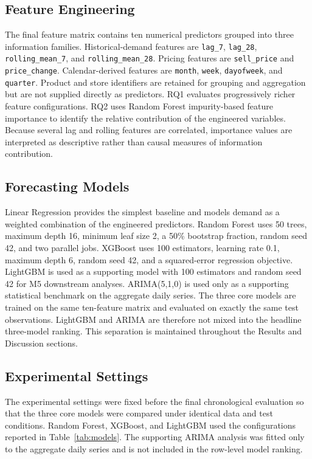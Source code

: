 \subsection{Feature Engineering}

The final feature matrix contains ten numerical predictors grouped into three information families.
Historical-demand features are \texttt{lag\_7}, \texttt{lag\_28}, \texttt{rolling\_mean\_7}, and \texttt{rolling\_mean\_28}.
Pricing features are \texttt{sell\_price} and \texttt{price\_change}.
Calendar-derived features are \texttt{month}, \texttt{week}, \texttt{dayofweek}, and \texttt{quarter}.
Product and store identifiers are retained for grouping and aggregation but are not supplied directly as predictors.
RQ1 evaluates progressively richer feature configurations.
RQ2 uses Random Forest impurity-based feature importance to identify the relative contribution of the engineered variables.
Because several lag and rolling features are correlated, importance values are interpreted as descriptive rather than causal measures of information contribution.

\subsection{Forecasting Models}

Linear Regression provides the simplest baseline and models demand as a weighted combination of the engineered predictors.
Random Forest uses 50 trees, maximum depth 16, minimum leaf size 2, a 50\% bootstrap fraction, random seed 42, and two parallel jobs.
XGBoost uses 100 estimators, learning rate 0.1, maximum depth 6, random seed 42, and a squared-error regression objective.
LightGBM is used as a supporting model with 100 estimators and random seed 42 for M5 downstream analyses.
ARIMA(5,1,0) is used only as a supporting statistical benchmark on the aggregate daily series.
The three core models are trained on the same ten-feature matrix and evaluated on exactly the same test observations.
LightGBM and ARIMA are therefore not mixed into the headline three-model ranking.
This separation is maintained throughout the Results and Discussion sections.

\subsection{Experimental Settings}

The experimental settings were fixed before the final chronological evaluation so that the three core models were compared under identical data and test conditions.
Random Forest, XGBoost, and LightGBM used the configurations reported in Table~\ref{tab:models}.
The supporting ARIMA analysis was fitted only to the aggregate daily series and is not included in the row-level model ranking.

